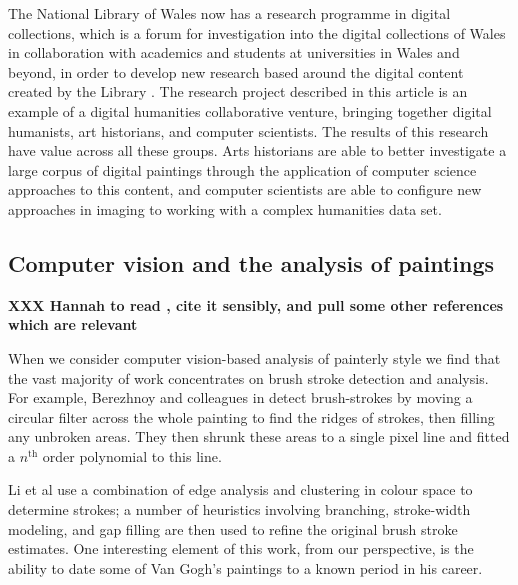 \documentclass[conference,a4paper]{IEEEtran}
\begin{document}
The National Library of Wales now has a research programme in digital
collections, which is a forum for investigation into the digital collections of
Wales in collaboration with academics and students at universities in Wales and
beyond, in order to develop new research based around the digital content
created by the Library \cite{llgc}. The research project described in this
article is an example of a digital humanities collaborative venture, bringing
together digital humanists, art historians, and computer scientists.  The
results of this research have value across all these groups. Arts historians
are able to better investigate a large corpus of digital paintings through the
application of computer science approaches to this content, and computer
scientists are able to configure new approaches in imaging to working with a
complex humanities data set. 

\subsection{Computer vision and the analysis of paintings}


\textbf{XXX Hannah to read \cite{Stork2009Computer}, cite it sensibly, and pull some other references which are relevant}

When we consider computer vision-based analysis of painterly style we find that
the vast majority of  work concentrates on brush stroke detection and analysis.
For example, Berezhnoy and colleagues in \cite{Berezhnoy2009Automatic} detect
brush-strokes by moving a circular filter across the whole painting to find the
ridges of strokes, then filling any unbroken areas. They then shrunk these
areas to a single pixel line and fitted a $n^{\text{th}}$ order polynomial to
this line.

Li et al \cite{Li2012Rhythmic} use a combination of edge analysis and
clustering in colour space to determine strokes; a number of heuristics
involving branching, stroke-width modeling, and gap filling are then used to
refine the original brush stroke estimates. One interesting element of this
work, from our perspective, is the ability to date some of Van Gogh's paintings
to a known period in his career.
\end{document}
